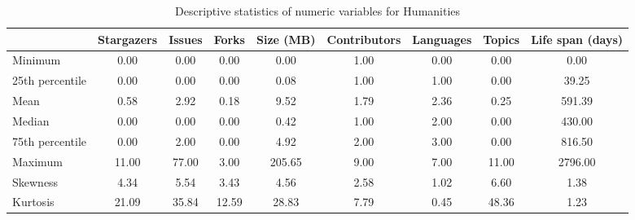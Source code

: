 \begin{table}
\centering
\caption{Descriptive statistics of numeric variables for Humanities}
\label{tab:Humanities}
\begin{tabular}{lcccccccc}
\toprule
{} &  Stargazers &  Issues &  Forks &  Size (MB) &  Contributors &  Languages &  Topics &  Life span (days) \\
\midrule
Minimum         &        0.00 &    0.00 &   0.00 &       0.00 &          1.00 &       0.00 &    0.00 &              0.00 \\
25th percentile &        0.00 &    0.00 &   0.00 &       0.08 &          1.00 &       1.00 &    0.00 &             39.25 \\
Mean            &        0.58 &    2.92 &   0.18 &       9.52 &          1.79 &       2.36 &    0.25 &            591.39 \\
Median          &        0.00 &    0.00 &   0.00 &       0.42 &          1.00 &       2.00 &    0.00 &            430.00 \\
75th percentile &        0.00 &    2.00 &   0.00 &       4.92 &          2.00 &       3.00 &    0.00 &            816.50 \\
Maximum         &       11.00 &   77.00 &   3.00 &     205.65 &          9.00 &       7.00 &   11.00 &           2796.00 \\
Skewness        &        4.34 &    5.54 &   3.43 &       4.56 &          2.58 &       1.02 &    6.60 &              1.38 \\
Kurtosis        &       21.09 &   35.84 &  12.59 &      28.83 &          7.79 &       0.45 &   48.36 &              1.23 \\
\bottomrule
\end{tabular}
\end{table}

